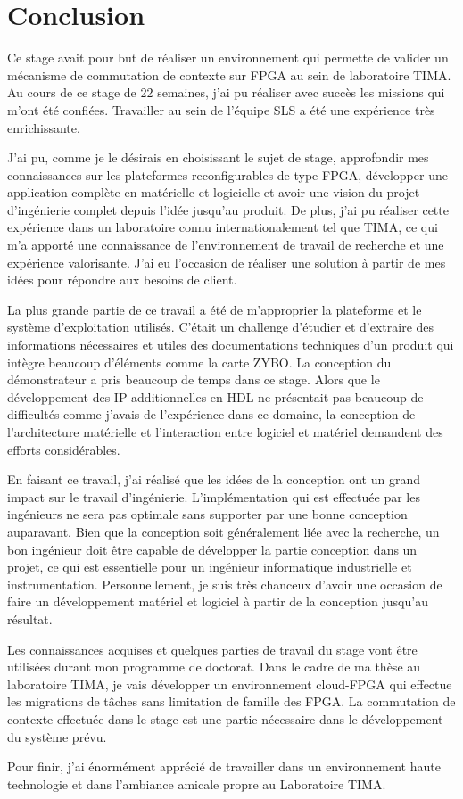 \chapter{Conclusion}

Ce stage avait pour but de réaliser un environnement qui permette de valider un mécanisme de
commutation de contexte sur FPGA au sein de laboratoire TIMA.
Au cours de ce stage de 22 semaines, j’ai pu réaliser avec succès les missions qui m’ont été confiées.
Travailler au sein de l’équipe SLS a été une expérience très enrichissante. 

J’ai pu, comme je le désirais en choisissant le sujet de stage, approfondir mes connaissances 
sur les plateformes reconfigurables de type FPGA, développer une application complète en matérielle et logicielle
et avoir une vision du projet d'ingénierie complet depuis l'idée jusqu'au produit.
De plus, j'ai pu réaliser cette expérience dans un laboratoire connu internationalement tel que TIMA, ce qui
m'a apporté une connaissance de l'environnement de travail de recherche et une expérience valorisante.
J'ai eu l'occasion de réaliser une solution à partir de mes idées pour répondre aux besoins de client.

La plus grande partie de ce travail a été de m'approprier la plateforme et le système d'exploitation utilisés.
C'était un challenge d'étudier et d'extraire des informations nécessaires et utiles des documentations techniques
d'un produit qui intègre beaucoup d'éléments comme la carte ZYBO.
La conception du démonstrateur a pris beaucoup de temps dans ce stage. 
Alors que le développement
des IP additionnelles en HDL ne présentait pas beaucoup de difficultés comme j'avais de l'expérience dans ce domaine, la conception
de l'architecture matérielle et l'interaction entre logiciel et matériel demandent des efforts considérables.

En faisant ce travail, j'ai réalisé que les idées de la conception ont un grand impact sur le travail
d'ingénierie. L'implémentation qui est effectuée par les ingénieurs ne sera pas optimale
sans supporter par une bonne conception auparavant.
Bien que la conception soit généralement liée avec la recherche,
un bon ingénieur doit être capable de développer la partie conception dans un projet,
ce qui est essentielle pour un ingénieur informatique industrielle et instrumentation.
Personnellement, je suis très chanceux d'avoir une occasion de faire un développement matériel et logiciel
à partir de la conception jusqu'au résultat.

Les connaissances acquises et quelques parties de travail du stage vont être utilisées durant mon programme de doctorat.
Dans le cadre de ma thèse au laboratoire TIMA, je vais développer un environnement cloud-FPGA qui effectue
les migrations de tâches sans limitation de famille des FPGA. La commutation de contexte effectuée dans le stage
est une partie nécessaire dans le développement du système prévu.

Pour finir, j’ai énormément apprécié de travailler dans un environnement haute technologie et dans l’ambiance amicale propre au Laboratoire TIMA.